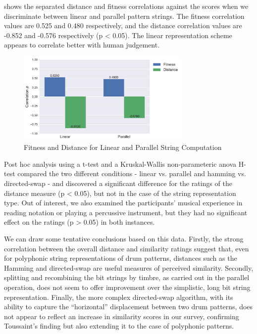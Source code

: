 {{ shows the separated distance and fitness correlations against the scores when we discriminate between linear and parallel pattern strings. The fitness correlation values are 0.525 and 0.480 respectively, and the distance correlation values are -0.852 and -0.576 respectively (p < 0.05). The linear representation scheme appears to correlate better with human judgement.

\begin{figure}
	\begin{center}
		\includegraphics[width=0.75\textwidth]{ch03_symbolic/figures/reps_bar.pdf}
	\end{center}
	\caption[Fitness and Distance for Linear and Parallel String Computation]{Fitness and Distance for Linear and Parallel String Computation}
	\label{fig:linear_versus_parallel}
\end{figure}

Post hoc analysis using a t-test and a Kruskal-Wallis non-parameteric \acrshort{anova} H-test compared the two different conditions - linear vs. parallel and hamming vs. directed-swap - and discovered a significant difference for the ratings of the distance measure (p < 0.05), but not in the case of the string representation type. Out of interest, we also examined the participants' musical experience in reading notation or playing a percussive instrument, but they had no significant effect on the ratings (p > 0.05) in both instances.

We can draw some tentative conclusions based on this data. Firstly, the strong correlation between the overall distance and similarity ratings suggest that, even for polyphonic string representations of drum patterns, distances such as the Hamming and directed-swap are useful measures of perceived similarity. Secondly, splitting and recombining the bit strings by timbre, as carried out in the parallel operation, does not seem to offer improvement over the simplistic, long bit string representation. Finally, the more complex directed-swap algorithm, with its ability to capture the ``horizontal'' displacement between two drum patterns, does not appear to reflect an increase in similarity scores in our survey, confirming Toussaint's finding but also extending it to the case of polyphonic patterns.

}}
